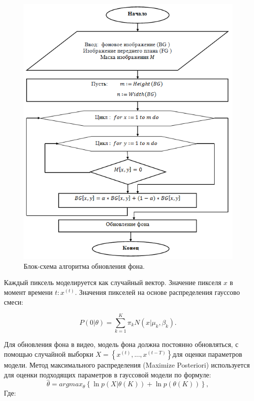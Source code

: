 \begin{figure}[ht!]
\centering
\includegraphics [scale=1] {images/h11.png}
\begin{center}
\caption{Блок-схема алгоритма обновления фона.} \label{img11}
\end{center}
\end{figure}

Каждый пиксель моделируется как случайный вектор. Значение пикселя $x$ в момент времени $t : x^{\left(t\right)}$. Значения пикселей на основе распределения гауссово смеси:

\begin{equation}\label{eq11}
P\left(0|\theta\right)=\sum^K_{k=1}\pi_kN\left(x|\mu_k,\beta_k\right).
\end{equation}

Для обновления фона в видео, модель фона должна постоянно обновляться, с помощью случайной выборки $X=\left\{x^{\left(t\right)},..., x^{\left(t-T\right)}\right\}$для оценки параметров модели. Метод максимального распределения (Maximize Posteriori) используется для оценки подходящих параметров в гауссовой модели по формуле:
\begin{equation}\label{eq12}
\hat{\theta} = argmax_\theta \left\{\ln p\left(X|\theta\left(K\right)\right)+\ln p\left(\theta\left(K\right)\right)\right\},
\end{equation}
Где:

